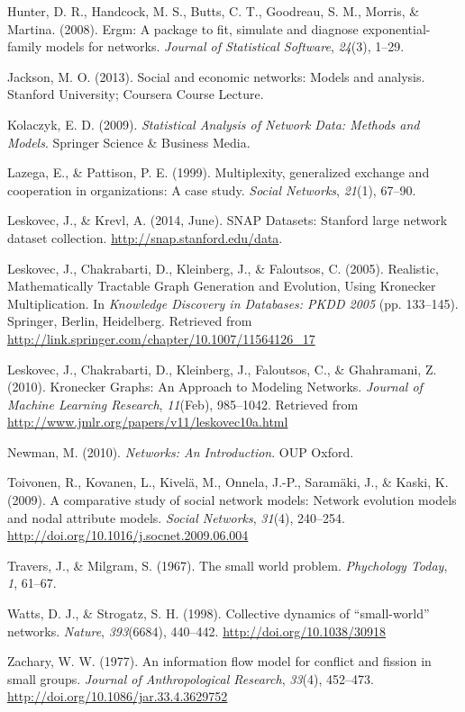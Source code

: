 \documentclass[12pt,twoside]{amherstthesis}
\begin{document}
  \hypertarget{ref-ergmpackagearticle}{}
  Hunter, D. R., Handcock, M. S., Butts, C. T., Goodreau, S. M., Morris,
  \& Martina. (2008). Ergm: A package to fit, simulate and diagnose
  exponential-family models for networks. \emph{Journal of Statistical
  Software}, \emph{24}(3), 1--29.
  
  \hypertarget{ref-jacksonergms2013}{}
  Jackson, M. O. (2013). Social and economic networks: Models and
  analysis. Stanford University; Coursera Course Lecture.
  
  \hypertarget{ref-kolaczyk_statistical_2009}{}
  Kolaczyk, E. D. (2009). \emph{Statistical Analysis of Network Data:
  Methods and Models}. Springer Science \& Business Media.
  
  \hypertarget{ref-lazega1999multiplexity}{}
  Lazega, E., \& Pattison, P. E. (1999). Multiplexity, generalized
  exchange and cooperation in organizations: A case study. \emph{Social
  Networks}, \emph{21}(1), 67--90.
  
  \hypertarget{ref-snapnets}{}
  Leskovec, J., \& Krevl, A. (2014, June). SNAP Datasets: Stanford large
  network dataset collection. \url{http://snap.stanford.edu/data}.
  
  \hypertarget{ref-leskovec_realistic_2005}{}
  Leskovec, J., Chakrabarti, D., Kleinberg, J., \& Faloutsos, C. (2005).
  Realistic, Mathematically Tractable Graph Generation and Evolution,
  Using Kronecker Multiplication. In \emph{Knowledge Discovery in
  Databases: PKDD 2005} (pp. 133--145). Springer, Berlin, Heidelberg.
  Retrieved from
  \url{http://link.springer.com/chapter/10.1007/11564126_17}
  
  \hypertarget{ref-leskovec_kronecker_2010}{}
  Leskovec, J., Chakrabarti, D., Kleinberg, J., Faloutsos, C., \&
  Ghahramani, Z. (2010). Kronecker Graphs: An Approach to Modeling
  Networks. \emph{Journal of Machine Learning Research}, \emph{11}(Feb),
  985--1042. Retrieved from
  \url{http://www.jmlr.org/papers/v11/leskovec10a.html}
  
  \hypertarget{ref-newman_networks:_2010}{}
  Newman, M. (2010). \emph{Networks: An Introduction}. OUP Oxford.
  
  \hypertarget{ref-toivonen_comparative_2009}{}
  Toivonen, R., Kovanen, L., Kivelä, M., Onnela, J.-P., Saramäki, J., \&
  Kaski, K. (2009). A comparative study of social network models: Network
  evolution models and nodal attribute models. \emph{Social Networks},
  \emph{31}(4), 240--254.
  \url{http://doi.org/10.1016/j.socnet.2009.06.004}
  
  \hypertarget{ref-travers1967small}{}
  Travers, J., \& Milgram, S. (1967). The small world problem.
  \emph{Phychology Today}, \emph{1}, 61--67.
  
  \hypertarget{ref-watts_collective_1998}{}
  Watts, D. J., \& Strogatz, S. H. (1998). Collective dynamics of
  ``small-world'' networks. \emph{Nature}, \emph{393}(6684), 440--442.
  \url{http://doi.org/10.1038/30918}
  
  \hypertarget{ref-zachskarateclub}{}
  Zachary, W. W. (1977). An information flow model for conflict and
  fission in small groups. \emph{Journal of Anthropological Research},
  \emph{33}(4), 452--473. \url{http://doi.org/10.1086/jar.33.4.3629752}


\end{document}
